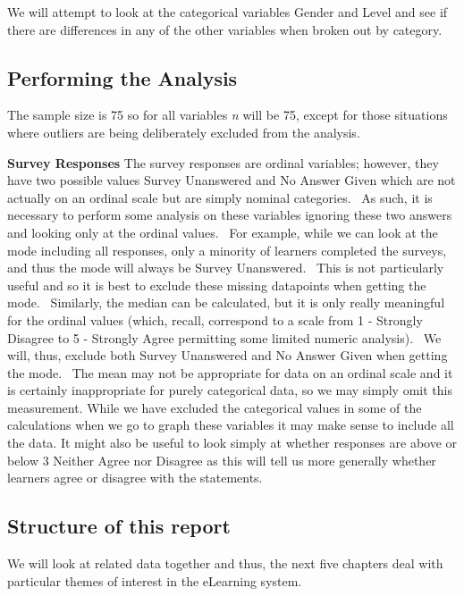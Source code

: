 \documentclass[12pt,twoside]{article}
\begin{document}
We will attempt to look at the categorical variables Gender and Level
and see if there are differences in any of the other variables when
broken out by category. 

\subsection[Performing the Analysis ]{\textrm{Performing the Analysis} }
The sample size is 75 so for all variables \textit{n} will be 75, except
for those situations where outliers are being deliberately excluded
from the analysis.

\textbf{Survey Responses}\newline
The survey responses are ordinal variables; however, they have two
possible values {\textquotedbl}Survey Unanswered{\textquotedbl} and
{\textquotedbl}No Answer Given{\textquotedbl} which are not actually on
an ordinal scale but are simply nominal categories.~ As such, it is
necessary to perform some analysis on these variables ignoring these
two answers and looking only at the ordinal values.~ For example, while
we can look at the mode including all responses, only a minority of
learners completed the surveys, and thus the mode will always be
{\textquotedbl}Survey Unanswered{\textquotedbl}.~ This is not
particularly useful and so it is best to exclude these missing
datapoints when getting the mode.~ Similarly, the median can be
calculated, but it is only really meaningful for the ordinal values
(which, recall, correspond to a scale from 1 {}- Strongly Disagree to 5
{}- Strongly Agree permitting some limited numeric analysis).~ We will,
thus, exclude both {\textquotedbl}Survey Unanswered{\textquotedbl} and
{\textquotedbl}No Answer Given{\textquotedbl} when getting the mode.~
The mean may not be appropriate for data on an ordinal scale and it is
certainly inappropriate for purely categorical data, so we may simply
omit this measurement.\newline
While we have excluded the categorical values in some of the
calculations when we go to graph these variables it may make sense to
include all the data.\newline
It might also be useful to look simply at whether responses are above or
below 3 {\textquotedbl}Neither Agree nor Disagree{\textquotedbl} as
this will tell us more generally whether learners agree or disagree
with the statements.

\subsection{Structure of this report}
We will look at related data together and thus, the next five chapters
deal with particular themes of interest in the eLearning system. 
\end{document}
